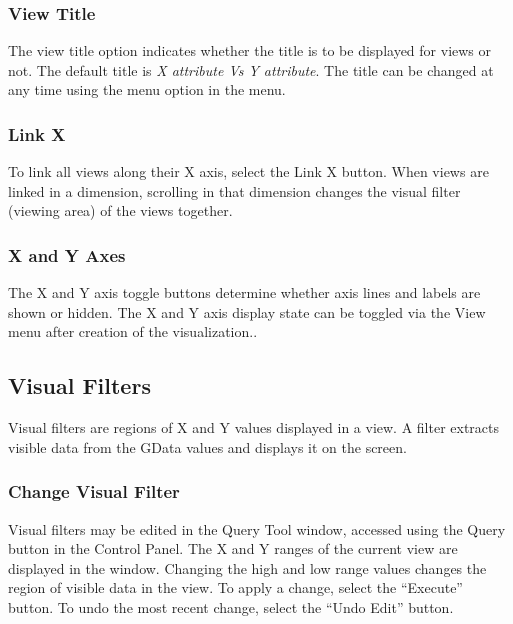 \subsubsection{View Title}

The view title option indicates whether the title is to be displayed
for views or not. The default title is {\em X attribute Vs Y attribute}.
The title can be changed at any time using the  menu option in
the  menu.

\subsubsection{Link X}

To link all views along their X axis, select the Link X button. When views are
linked in a dimension, scrolling in that dimension changes the visual filter
(viewing area) of the views together.

\subsubsection{X and Y Axes}

The X and Y axis toggle buttons determine whether axis lines and labels are
shown or hidden. The X and Y axis display state can be toggled via the View menu
after creation of the visualization..


\subsection{Visual Filters}

Visual filters are regions of X and Y values displayed in a view. A filter
extracts visible data from the GData values and displays it on the screen.

\subsubsection{Change Visual Filter}

Visual filters may be edited in the Query Tool window, accessed using the Query
button in the Control Panel. The X and Y ranges of the current view are
displayed in the window. Changing the high and low range values changes the
region of visible data in the view. To apply a change, select the ``Execute''
button. To undo the most recent change, select the ``Undo Edit'' button.

